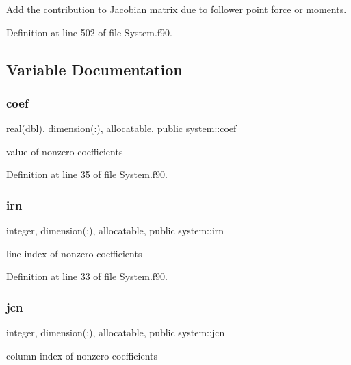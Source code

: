 Add the contribution to Jacobian matrix due to follower point force or moments. 



Definition at line 502 of file System.\+f90.



\subsection{Variable Documentation}
\mbox{\label{namespacesystem_ac5c6f08d5a21faff727c9a1240bae697}} 
\subsubsection{\texorpdfstring{coef}{coef}}
{\footnotesize\ttfamily real(dbl), dimension(\+:), allocatable, public system\+::coef}



value of nonzero coefficients 



Definition at line 35 of file System.\+f90.

\mbox{\label{namespacesystem_af8a50eade1073ff9c211526848dcec38}} 
\subsubsection{\texorpdfstring{irn}{irn}}
{\footnotesize\ttfamily integer, dimension(\+:), allocatable, public system\+::irn}



line index of nonzero coefficients 



Definition at line 33 of file System.\+f90.

\mbox{\label{namespacesystem_a32a5c04fae61a0d6a90727cd0bab43a7}} 
\subsubsection{\texorpdfstring{jcn}{jcn}}
{\footnotesize\ttfamily integer, dimension(\+:), allocatable, public system\+::jcn}



column index of nonzero coefficients 



